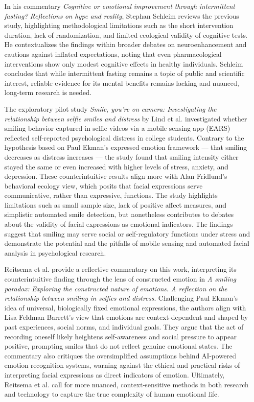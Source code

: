 \documentclass[authordate, empirical, issue]{jote-new-article}
\begin{document}
	In his commentary \emph{Cognitive or emotional improvement through intermittent fasting? Reflections on hype and reality}, Stephan Schleim reviews the previous study, highlighting methodological limitations such as the short intervention duration, lack of randomization, and limited ecological validity of cognitive tests. He contextualizes the findings within broader debates on neuroenhancement and cautions against inflated expectations, noting that even pharmacological interventions show only modest cognitive effects in healthy individuals. Schleim concludes that while intermittent fasting remains a topic of public and scientific interest, reliable evidence for its mental benefits remains lacking and nuanced, long-term research is needed.



	The exploratory pilot study \emph{Smile, you're on camera: Investigating the relationship between selfie smiles and distress} by Lind et al. investigated whether smiling behavior captured in selfie videos via a mobile sensing app (EARS) reflected self-reported psychological distress in college students. Contrary to the hypothesis based on Paul Ekman's expressed emotion framework — that smiling decreases as distress increases — the study found that smiling intensity either stayed the same or even increased with higher levels of stress, anxiety, and depression. These counterintuitive results align more with Alan Fridlund's behavioral ecology view, which posits that facial expressions serve communicative, rather than expressive, functions. The study highlights limitations such as small sample size, lack of positive affect measures, and simplistic automated smile detection, but nonetheless contributes to debates about the validity of facial expressions as emotional indicators. The findings suggest that smiling may serve social or self-regulatory functions under stress and demonstrate the potential and the pitfalls of mobile sensing and automated facial analysis in psychological research.



	Reitsema et al. provide a reflective commentary on this work, interpreting its counterintuitive finding through the lens of constructed emotion in \emph{A smiling paradox: Exploring the constructed nature of emotions. A reflection on the relationship between smiling in selfies and distress.} Challenging Paul Ekman's idea of universal, biologically fixed emotional expressions, the authors align with Lisa Feldman Barrett's view that emotions are context-dependent and shaped by past experiences, social norms, and individual goals. They argue that the act of recording oneself likely heightens self-awareness and social pressure to appear positive, prompting smiles that do not reflect genuine emotional states. The commentary also critiques the oversimplified assumptions behind AI-powered emotion recognition systems, warning against the ethical and practical risks of interpreting facial expressions as direct indicators of emotion. Ultimately, Reitsema et al. call for more nuanced, context-sensitive methods in both research and technology to capture the true complexity of human emotional life.
\end{document}
